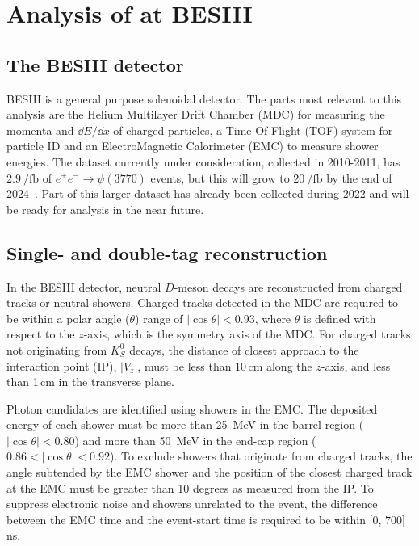 \documentclass[12pt, a4paper, notitlepage, onecolumn]{article}
\begin{document}
\section{Analysis of \texorpdfstring{}{D2KKpipi} at BESIII}
\subsection{The BESIII detector}
\noindent BESIII \cite{Ablikim:2009aa} is a general purpose solenoidal detector. The parts most relevant to this analysis are the Helium Multilayer Drift Chamber (MDC) for measuring the momenta and $\dd{E}/\dd{x}$ of charged particles, a Time Of Flight (TOF) system for particle ID and an ElectroMagnetic Calorimeter (EMC) to measure shower energies. The dataset currently under consideration, collected in 2010-2011, has $\SI{2.9}{\per\femto\barn}$ of $e^+e^-\to\psi(3770)$ events, but this will grow to $\SI{20}{\per\femto\barn}$ by the end of 2024~\cite{cite:BESIIIWhitePaper}. Part of this larger dataset has already been collected during 2022 and will be ready for analysis in the near future.

\subsection{Single- and double-tag reconstruction}
\noindent In the BESIII detector, neutral $D$-meson decays are reconstructed from charged tracks or neutral showers. Charged tracks detected in the MDC are required to be within a polar angle ($\theta$) range of $|\!\cos\theta|<0.93$, where $\theta$ is defined with respect to the $z$-axis, which is the symmetry axis of the MDC. For charged tracks not originating from $K_S^0$ decays, the distance of closest approach to the interaction point (IP), $|V_{z}|$, must be less than 10\,cm along the $z$-axis, and less than 1\,cm in the transverse plane.

Photon candidates are identified using showers in the EMC. The deposited energy of each shower must be more than 25~MeV in the barrel region ($|\cos \theta|< 0.80$) and more than 50~MeV in the end-cap region ($0.86 <|\!\cos \theta|< 0.92$). To exclude showers that originate from charged tracks, the angle subtended by the EMC shower and the position of the closest charged track at the EMC must be greater than 10 degrees as measured from the IP. To suppress electronic noise and showers unrelated to the event, the difference between the EMC time and the event-start time is required to be within [0, 700]\,ns.
\end{document}
